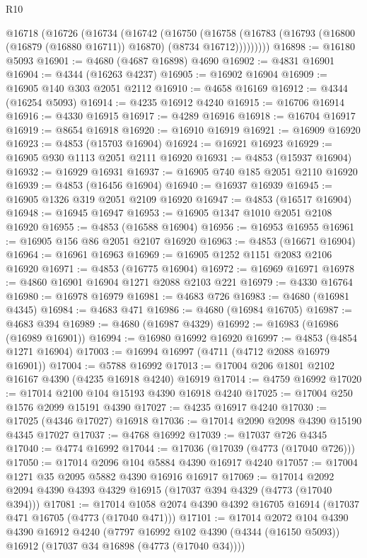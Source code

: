 \begin{lexlean}{R10}
\begin{coremodule}
    @16718
      (@16726
        (@16734
          (@16742
            (@16750
              (@16758
                (@16783 (@16793 (@16800 (@16879 (@16880 @16711)) @16870) (@8734 @16712)))))))))
@16898 := @16180 @5093
@16901 := @4680 (@4687 @16898) @4690
@16902 := @4831 @16901
@16904 := @4344 (@16263 @4237)
@16905 := @16902 @16904
@16909 := @16905 @140 @303 @2051 @2112
@16910 := @4658 @16169
@16912 := @4344 (@16254 @5093)
@16914 := @4235 @16912 @4240
@16915 := @16706 @16914
@16916 := @4330 @16915
@16917 := @4289 @16916
@16918 := @16704 @16917
@16919 := @8654 @16918
@16920 := @16910 @16919
@16921 := @16909 @16920
@16923 := @4853 (@15703 @16904)
@16924 := @16921 @16923
@16929 := @16905 @930 @1113 @2051 @2111 @16920
@16931 := @4853 (@15937 @16904)
@16932 := @16929 @16931
@16937 := @16905 @740 @185 @2051 @2110 @16920
@16939 := @4853 (@16456 @16904)
@16940 := @16937 @16939
@16945 := @16905 @1326 @319 @2051 @2109 @16920
@16947 := @4853 (@16517 @16904)
@16948 := @16945 @16947
@16953 := @16905 @1347 @1010 @2051 @2108 @16920
@16955 := @4853 (@16588 @16904)
@16956 := @16953 @16955
@16961 := @16905 @156 @86 @2051 @2107 @16920
@16963 := @4853 (@16671 @16904)
@16964 := @16961 @16963
@16969 := @16905 @1252 @1151 @2083 @2106 @16920
@16971 := @4853 (@16775 @16904)
@16972 := @16969 @16971
@16978 := @4860 @16901 @16904 @1271 @2088 @2103 @221
@16979 := @4330 @16764
@16980 := @16978 @16979
@16981 := @4683 @726
@16983 := @4680 (@16981 @4345)
@16984 := @4683 @471
@16986 := @4680 (@16984 @16705)
@16987 := @4683 @394
@16989 := @4680 (@16987 @4329)
@16992 := @16983 (@16986 (@16989 @16901))
@16994 := @16980 @16992 @16920
@16997 := @4853 (@4854 @1271 @16904)
@17003 := @16994 @16997 (@4711 (@4712 @2088 @16979 @16901))
@17004 := @5788 @16992
@17013 := @17004 @206 @1801 @2102 @16167 @4390 (@4235 @16918 @4240) @16919
@17014 := @4759 @16992
@17020 := @17014 @2100 @104 @15193 @4390 @16918 @4240
@17025 := @17004 @250 @1576 @2099 @15191 @4390
@17027 := @4235 @16917 @4240
@17030 := @17025 (@4346 @17027) @16918
@17036 := @17014 @2090 @2098 @4390 @15190 @4345 @17027
@17037 := @4768 @16992
@17039 := @17037 @726 @4345
@17040 := @4774 @16992
@17044 := @17036 (@17039 (@4773 (@17040 @726)))
@17050 := @17014 @2096 @104 @5884 @4390 @16917 @4240
@17057 := @17004 @1271 @35 @2095 @5882 @4390 @16916 @16917
@17069 := @17014 @2092 @2094 @4390 @4393 @4329 @16915 (@17037 @394 @4329 (@4773 (@17040 @394)))
@17081 := @17014 @1058 @2074 @4390 @4392 @16705 @16914 (@17037 @471 @16705 (@4773 (@17040 @471)))
@17101 := @17014
    @2072
    @104
    @4390
    @4390
    @16912
    @4240
    (@7797 @16992 @102 @4390 (@4344 (@16150 @5093)) @16912 (@17037 @34 @16898 (@4773 (@17040 @34))))

\end{coremodule}
\end{lexlean}
